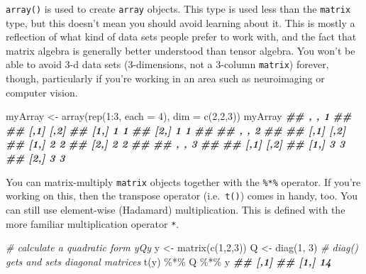 \documentclass[
  12pt,
  krantz2]{krantz}
\makeatletter
\newenvironment{Shaded}{\begin{snugshade}}{\end{snugshade}}
\newcommand{\AttributeTok}[1]{\textcolor[rgb]{0.61,0.61,0.61}{#1}}
\newcommand{\CommentTok}[1]{\textcolor[rgb]{0.37,0.37,0.37}{\textit{#1}}}
\newcommand{\DecValTok}[1]{\textcolor[rgb]{0.06,0.06,0.06}{#1}}
\newcommand{\DocumentationTok}[1]{\textcolor[rgb]{0.37,0.37,0.37}{\textbf{\textit{#1}}}}
\newcommand{\FunctionTok}[1]{\textcolor[rgb]{0,0,0}{#1}}
\newcommand{\NormalTok}[1]{#1}
\newcommand{\OtherTok}[1]{\textcolor[rgb]{0.37,0.37,0.37}{#1}}
\newcommand{\SpecialCharTok}[1]{\textcolor[rgb]{0,0,0}{#1}}
\newenvironment{kframe}{%
\medskip{}
\setlength{\fboxsep}{.8em}
 \def\at@end@of@kframe{}%
 \ifinner\ifhmode%
  \def\at@end@of@kframe{\end{minipage}}%
  \begin{minipage}{\columnwidth}%
 \fi\fi%
 \def\FrameCommand##1{\hskip\@totalleftmargin \hskip-\fboxsep
 \colorbox{shadecolor}{##1}\hskip-\fboxsep
     \hskip-\linewidth \hskip-\@totalleftmargin \hskip\columnwidth}%
 \MakeFramed {\advance\hsize-\width
   \@totalleftmargin\z@ \linewidth\hsize
   \@setminipage}}%
 {\par\unskip\endMakeFramed%
 \at@end@of@kframe}
\renewenvironment{Shaded}{\begin{kframe}}{\end{kframe}}
\makeatother
\begin{document}
\texttt{array()} is used to create \texttt{array} objects. This type is used less than the \texttt{matrix} type, but this doesn't mean you should avoid learning about it. This is mostly a reflection of what kind of data sets people prefer to work with, and the fact that matrix algebra is generally better understood than tensor algebra. You won't be able to avoid 3-d data sets (3-dimensions, not a 3-column \texttt{matrix}) forever, though, particularly if you're working in an area such as neuroimaging or computer vision.

\begin{Shaded}
\begin{Highlighting}[]
\NormalTok{myArray }\OtherTok{\textless{}{-}} \FunctionTok{array}\NormalTok{(}\FunctionTok{rep}\NormalTok{(}\DecValTok{1}\SpecialCharTok{:}\DecValTok{3}\NormalTok{, }\AttributeTok{each =} \DecValTok{4}\NormalTok{), }\AttributeTok{dim =} \FunctionTok{c}\NormalTok{(}\DecValTok{2}\NormalTok{,}\DecValTok{2}\NormalTok{,}\DecValTok{3}\NormalTok{))}
\NormalTok{myArray}
\DocumentationTok{\#\# , , 1}
\DocumentationTok{\#\# }
\DocumentationTok{\#\#      [,1] [,2]}
\DocumentationTok{\#\# [1,]    1    1}
\DocumentationTok{\#\# [2,]    1    1}
\DocumentationTok{\#\# }
\DocumentationTok{\#\# , , 2}
\DocumentationTok{\#\# }
\DocumentationTok{\#\#      [,1] [,2]}
\DocumentationTok{\#\# [1,]    2    2}
\DocumentationTok{\#\# [2,]    2    2}
\DocumentationTok{\#\# }
\DocumentationTok{\#\# , , 3}
\DocumentationTok{\#\# }
\DocumentationTok{\#\#      [,1] [,2]}
\DocumentationTok{\#\# [1,]    3    3}
\DocumentationTok{\#\# [2,]    3    3}
\end{Highlighting}
\end{Shaded}

You can matrix-multiply \texttt{matrix} objects together with the \texttt{\%*\%} operator. If you're working on this, then the transpose operator (i.e.~\texttt{t()}) comes in handy, too. You can still use element-wise (Hadamard) multiplication. This is defined with the more familiar multiplication operator \texttt{*}.

\begin{Shaded}
\begin{Highlighting}[]
\CommentTok{\# calculate a quadratic form y\textquotesingle{}Qy}
\NormalTok{y }\OtherTok{\textless{}{-}} \FunctionTok{matrix}\NormalTok{(}\FunctionTok{c}\NormalTok{(}\DecValTok{1}\NormalTok{,}\DecValTok{2}\NormalTok{,}\DecValTok{3}\NormalTok{))}
\NormalTok{Q }\OtherTok{\textless{}{-}} \FunctionTok{diag}\NormalTok{(}\DecValTok{1}\NormalTok{, }\DecValTok{3}\NormalTok{) }\CommentTok{\# diag() gets and sets diagonal matrices}
\FunctionTok{t}\NormalTok{(y) }\SpecialCharTok{\%*\%}\NormalTok{ Q }\SpecialCharTok{\%*\%}\NormalTok{ y}
\DocumentationTok{\#\#      [,1]}
\DocumentationTok{\#\# [1,]   14}
\end{Highlighting}
\end{Shaded}
\end{document}
